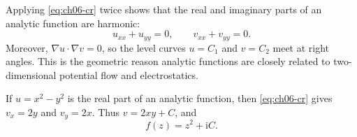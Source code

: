 Applying \eqref{eq:ch06-cr} twice shows that the real and imaginary parts of an analytic function are harmonic:
\begin{equation}
u_{xx}+u_{yy}=0,\qquad v_{xx}+v_{yy}=0.
\end{equation}
Moreover, $\nabla u\cdot\nabla v=0$, so the level curves $u=C_1$ and $v=C_2$ meet at right angles. This is the geometric reason analytic functions are closely related to two-dimensional potential flow and electrostatics.

\begin{example}
If $u=x^2-y^2$ is the real part of an analytic function, then \eqref{eq:ch06-cr} gives $v_x=2y$ and $v_y=2x$. Thus $v=2xy+C$, and
\begin{equation}
f(z)=z^2+\mathrm{i}C.
\end{equation}
\end{example}